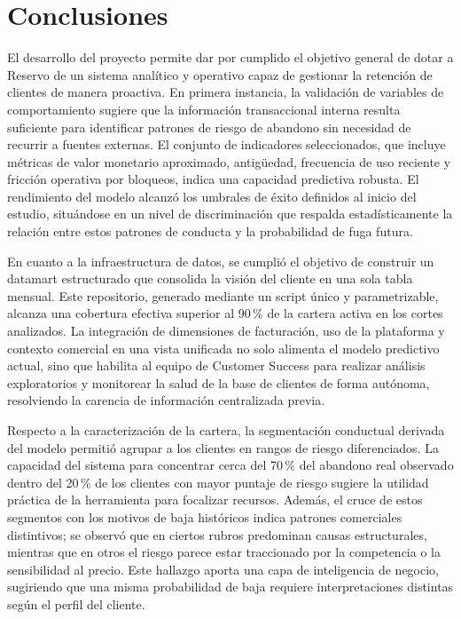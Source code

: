 \newpage
\section{Conclusiones}

El desarrollo del proyecto permite dar por cumplido el objetivo general de dotar a Reservo de un sistema analítico y operativo capaz de gestionar la retención de clientes de manera proactiva. En primera instancia, la validación de variables de comportamiento sugiere que la información transaccional interna resulta suficiente para identificar patrones de riesgo de abandono sin necesidad de recurrir a fuentes externas. El conjunto de indicadores seleccionados, que incluye métricas de valor monetario aproximado, antigüedad, frecuencia de uso reciente y fricción operativa por bloqueos, indica una capacidad predictiva robusta. El rendimiento del modelo alcanzó los umbrales de éxito definidos al inicio del estudio, situándose en un nivel de discriminación que respalda estadísticamente la relación entre estos patrones de conducta y la probabilidad de fuga futura.

En cuanto a la infraestructura de datos, se cumplió el objetivo de construir un datamart estructurado que consolida la visión del cliente en una sola tabla mensual. Este repositorio, generado mediante un script único y parametrizable, alcanza una cobertura efectiva superior al 90\,\% de la cartera activa en los cortes analizados. La integración de dimensiones de facturación, uso de la plataforma y contexto comercial en una vista unificada no solo alimenta el modelo predictivo actual, sino que habilita al equipo de Customer Success para realizar análisis exploratorios y monitorear la salud de la base de clientes de forma autónoma, resolviendo la carencia de información centralizada previa.

Respecto a la caracterización de la cartera, la segmentación conductual derivada del modelo permitió agrupar a los clientes en rangos de riesgo diferenciados. La capacidad del sistema para concentrar cerca del 70\,\% del abandono real observado dentro del 20\,\% de los clientes con mayor puntaje de riesgo sugiere la utilidad práctica de la herramienta para focalizar recursos. Además, el cruce de estos segmentos con los motivos de baja históricos indica patrones comerciales distintivos; se observó que en ciertos rubros predominan causas estructurales, mientras que en otros el riesgo parece estar traccionado por la competencia o la sensibilidad al precio. Este hallazgo aporta una capa de inteligencia de negocio, sugiriendo que una misma probabilidad de baja requiere interpretaciones distintas según el perfil del cliente.


